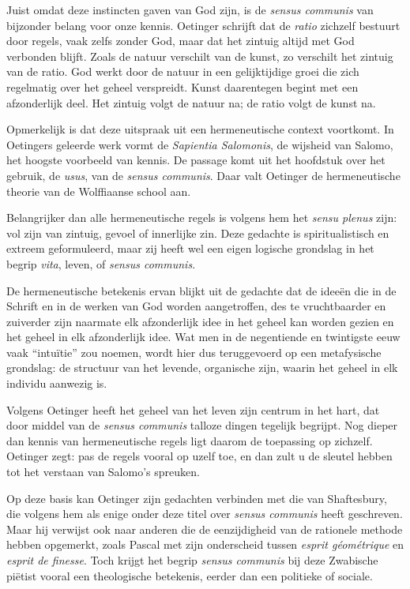 Juist omdat deze instincten gaven van God zijn, is de \textit{sensus communis} van bijzonder belang voor onze kennis. Oetinger schrijft dat de \textit{ratio} zichzelf bestuurt door regels, vaak zelfs zonder God, maar dat het zintuig altijd met God verbonden blijft. Zoals de natuur verschilt van de kunst, zo verschilt het zintuig van de ratio. God werkt door de natuur in een gelijktijdige groei die zich regelmatig over het geheel verspreidt. Kunst daarentegen begint met een afzonderlijk deel. Het zintuig volgt de natuur na; de ratio volgt de kunst na.

Opmerkelijk is dat deze uitspraak uit een hermeneutische context voortkomt. In Oetingers geleerde werk vormt de \textit{Sapientia Salomonis}, de wijsheid van Salomo, het hoogste voorbeeld van kennis. De passage komt uit het hoofdstuk over het gebruik, de \textit{usus}, van de \textit{sensus communis}. Daar valt Oetinger de hermeneutische theorie van de Wolffiaanse school aan.

Belangrijker dan alle hermeneutische regels is volgens hem het \textit{sensu plenus} zijn: vol zijn van zintuig, gevoel of innerlijke zin. Deze gedachte is spiritualistisch en extreem geformuleerd, maar zij heeft wel een eigen logische grondslag in het begrip \textit{vita}, leven, of \textit{sensus communis}.

De hermeneutische betekenis ervan blijkt uit de gedachte dat de ideeën die in de Schrift en in de werken van God worden aangetroffen, des te vruchtbaarder en zuiverder zijn naarmate elk afzonderlijk idee in het geheel kan worden gezien en het geheel in elk afzonderlijk idee. Wat men in de negentiende en twintigste eeuw vaak ``intuïtie'' zou noemen, wordt hier dus teruggevoerd op een metafysische grondslag: de structuur van het levende, organische zijn, waarin het geheel in elk individu aanwezig is.

Volgens Oetinger heeft het geheel van het leven zijn centrum in het hart, dat door middel van de \textit{sensus communis} talloze dingen tegelijk begrijpt. Nog dieper dan kennis van hermeneutische regels ligt daarom de toepassing op zichzelf. Oetinger zegt: pas de regels vooral op uzelf toe, en dan zult u de sleutel hebben tot het verstaan van Salomo's spreuken.

Op deze basis kan Oetinger zijn gedachten verbinden met die van Shaftesbury, die volgens hem als enige onder deze titel over \textit{sensus communis} heeft geschreven. Maar hij verwijst ook naar anderen die de eenzijdigheid van de rationele methode hebben opgemerkt, zoals Pascal met zijn onderscheid tussen \textit{esprit géométrique} en \textit{esprit de finesse}. Toch krijgt het begrip \textit{sensus communis} bij deze Zwabische piëtist vooral een theologische betekenis, eerder dan een politieke of sociale.

